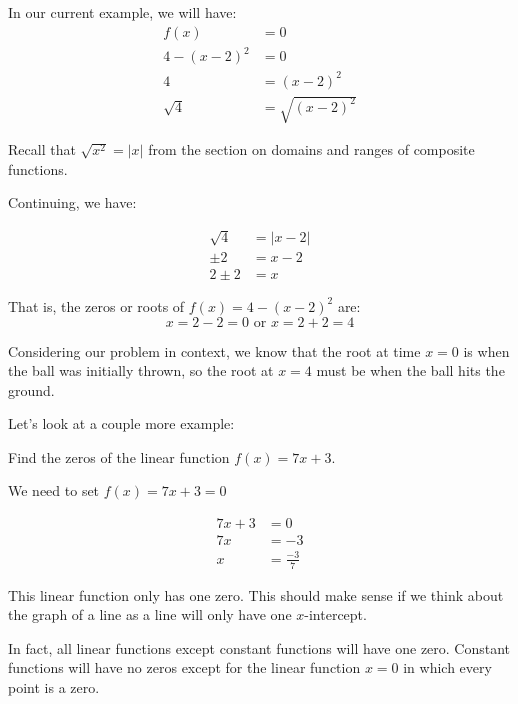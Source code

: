 \documentclass[nooutcomes]{ximera}
\begin{document}
\begin{example}
\begin{explanation}
In our current example, we will have:
\begin{align*}
f(x)&=0\\
4-(x-2)^2&=0 \\
4&=(x-2)^2 \\
 \sqrt{4}&=\sqrt{(x-2)^2}
\end{align*}  

Recall that $\sqrt{x^2}=|x|$ from the section on domains and ranges of composite functions.

Continuing, we have:

\begin{align*}
\sqrt{4}&= |x-2|\\
\pm 2&= x-2\\
2\pm 2&= x
\end{align*}  

That is, the zeros or roots of $f(x)=4-(x-2)^2$  are:
$$
x=2-2=0 \text{ or } x=2+2=4
$$

Considering our problem in context, we know that the root at time $x=0$ is when the ball was initially thrown, so the root at $x=4$ must be when the ball hits the ground.

\end{explanation}

\end{example}

Let's look at a couple more example:

\begin{example}
Find the zeros of the linear function $f(x)=7x+3$.

\begin{explanation}
We need to set $f(x)=7x+3=0$

\begin{align*}
7x+3&=0\\
7x&=-3\\
x&=\tfrac{-3}{7}
\end{align*}  

This linear function only has one zero.  This should make sense if we think about the graph of a line as a line will only have one $x$-intercept.

\begin{image}
\end{image}

In fact, all linear functions except constant functions will have one zero.  Constant functions will have no zeros except for the linear function $x=0$ in which every point is a zero.
\end{explanation}
\end{example}
\end{document}
